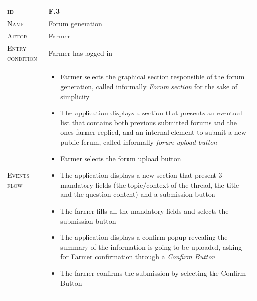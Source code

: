 
\begin{table}[H]
    \centering
    \begin{tabular}{|l|p{}|}
        \hline %
    	\textsc{id}                 &   F.3\\
    	\hline %
    	\textsc{Name}               &   Forum generation\\
    	\hline %
    	\textsc{Actor}             &   Farmer\\
    	\hline %
    	\textsc{Entry condition}   &   Farmer has logged in\\
    	\hline %
    	\textsc{Events flow}         &   %
            	                        \begin{itemize}
                                    	    \item Farmer selects the graphical section responsible of the forum generation, called informally \textit{Forum section} for the sake of simplicity
                                    		\item The application displays a section that presents an eventual list that contains both previous submitted forums and the ones farmer replied, and an internal element to submit a new public forum, called informally \textit{forum upload button}
                                    		\item Farmer selects the forum upload button
                                    		\item The application displays a new section that present 3 mandatory fields (the topic/context of the thread, the title and the question content) and a submission button
                                    		\item The farmer fills all the mandatory fields and selects the submission button
                                    		\item The application displays a confirm popup revealing the summary of the information is going to be uploaded, asking for Farmer confirmation through a \textit{Confirm Button}
                                    		\item The farmer confirms the submission by selecting the Confirm Button

\end{itemize}
\end{tabular}
\end{table}

